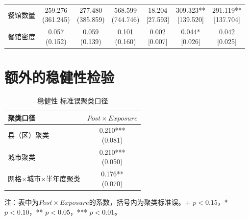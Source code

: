 \documentclass[a4paper,12pt]{report}
\begin{document}
\begin{table}[H]
\begin{adjustbox}{width=\textwidth,center}
\begin{tabular}{lcccccc}
餐馆数量 & \makecell{259.276\\(361.245)} & \makecell{277.480\\(385.859)} & \makecell{568.599\\(744.746)} & \makecell{18.204\\ {[27.593]}} & \makecell{309.323**\\ {[139.520]}} & \makecell{291.119**\\ {[137.704]}} \\
餐馆密度 & \makecell{0.057\\(0.152)} & \makecell{0.059\\(0.139)} & \makecell{0.101\\(0.160)} & \makecell{0.002\\ {[0.007]}} & \makecell{0.044*\\ {[0.026]}} & \makecell{0.042\\ {[0.025]}} \\
\bottomrule
\end{tabular}
\end{adjustbox}
\end{table}

\section{额外的稳健性检验}

\begin{table}[H]
\centering
\caption{稳健性 标准误聚类口径}
\label{tab:robust_se}
\begin{tabular*}{\textwidth}{@{\extracolsep{\fill}}lc}
\toprule
聚类口径 & $Post\times Exposure$ \\
\midrule
县（区）聚类 & \makecell{0.210***\\(0.081)} \\
城市聚类 & \makecell{0.210***\\(0.050)} \\
网格$\times$城市$\times$半年度聚类 & \makecell{0.176**\\(0.070)} \\
\bottomrule
\end{tabular*}
\vspace{0.2cm}

\par\raggedright{} 注：表中为$Post\times Exposure$的系数，括号内为聚类标准误。+ $p<0.15$，* $p<0.10$，** $p<0.05$，*** $p<0.01$。
\end{table}
\end{document}
